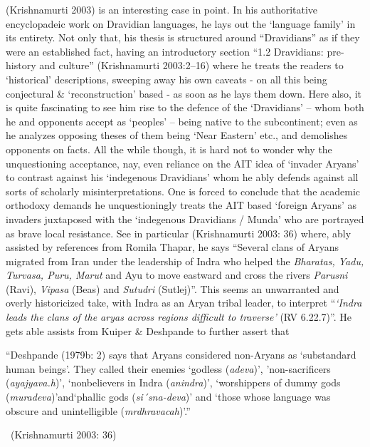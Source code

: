 (Krishnamurti 2003) is an interesting case in point. In his authoritative encyclopadeic work on Dravidian languages, he lays out the ‘language family’ in its entirety. Not only that, his thesis is structured around “Dravidians” as if they were an established fact, having an introductory section “1.2 Dravidians: pre-history and culture” (Krishnamurti 2003:2–16) where he treats the readers to ‘historical’ descriptions, sweeping away his own caveats - on all this being conjectural \& ‘reconstruction’ based - as soon as he lays them down. Here also, it is quite fascinating to see him rise to the defence of the ‘Dravidians’ – whom both he and opponents accept as ‘peoples’ – being native to the subcontinent; even as he analyzes opposing theses of them being ‘Near Eastern’ etc., and demolishes opponents on facts. All the while though, it is hard not to wonder why the unquestioning acceptance, nay, even reliance on the AIT idea of ‘invader Aryans’ to contrast against his ‘indegenous Dravidians’ whom he ably defends against all sorts of scholarly misinterpretations. One is forced to conclude that the academic orthodoxy demands he unquestioningly treats the AIT based ‘foreign Aryans’ as invaders juxtaposed with the ‘indegenous Dravidians / Munda’ who are portrayed as brave local resistance. See in particular (Krishnamurti 2003: 36) where, ably assisted by references from Romila Thapar, he says “Several clans of Aryans migrated from Iran under the leadership of Indra who helped the \textit{Bharatas, Yadu, Turvasa, Puru, Marut} and Ayu to move eastward and cross the rivers \textit{Parusni} (Ravi), \textit{Vipasa} (Beas) and \textit{Sutudri} (Sutlej)”. This seems an unwarranted and overly historicized take, with Indra as an Aryan tribal leader, to interpret “\textit{‘Indra leads the clans of the aryas across regions difficult to traverse’} (RV 6.22.7)”. He gets able assists from Kuiper \& Deshpande to further assert that

\begin{myquote}
“Deshpande (1979b: 2) says that Aryans considered non-Aryans as ‘substandard human beings’. They called their enemies `godless (\textit{adeva})’, ’non-sacrificers (\textit{ayajyava.h})’, ‘nonbelievers in Indra (\textit{anindra})’, ‘worshippers of dummy gods (\textit{muradeva})’and‘phallic gods (\textit{si´sna-deva})’ and ‘those whose language was obscure and unintelligible (\textit{mrdhravacah})’.” 

~\hfill (Krishnamurti 2003: 36)
\end{myquote}

